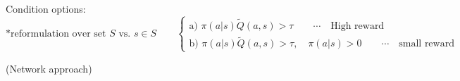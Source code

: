 Condition options:
\begin{equation*}
\ast \text{reformulation over set }S\text{\ vs.\ }s\in S\qquad 
\left\{ 
\begin{array}{l}
\text{a)\ }\pi(a|s)\tilde{Q}(a,s)>\tau \qquad \cdots \quad \text{High reward} \\
\text{b)\ }\pi(a|s)\tilde{Q}(a,s)>\tau,\quad\pi(a|s)>0\qquad \cdots \quad \text{small reward}
\end{array}
\right.
\end{equation*}



(Network approach)\\ 


